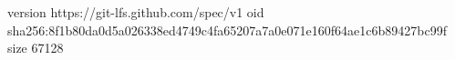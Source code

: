 version https://git-lfs.github.com/spec/v1
oid sha256:8f1b80da0d5a026338ed4749c4fa65207a7a0e071e160f64ae1c6b89427bc99f
size 67128
